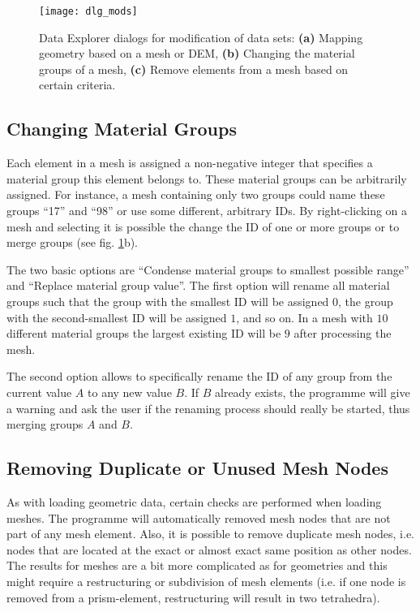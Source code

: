 \begin{figure}[tb]
\begin{center}
\texttt{[image: dlg\_mods]}
\end{center}
\caption{\ogs Data Explorer dialogs for modification of data sets: \textbf{(a)} Mapping geometry based on a mesh or DEM, \textbf{(b)} Changing the material groups of a mesh, \textbf{(c)} Remove elements from a mesh based on certain criteria.} \label{fig:dlgmods}
\end{figure}

\subsection{Changing Material Groups}

Each element in a mesh is assigned a non-negative integer that specifies a material group this element belongs to. These material groups can be arbitrarily assigned. For instance, a mesh containing only two groups could name these groups ``17'' and ``98'' or use some different, arbitrary IDs. By right-clicking on a mesh and selecting  it is possible the change the ID of one or more groups or to merge groups (see fig. \ref{fig:dlgmods}b).

The two basic options are ``Condense material groups to smallest possible range'' and ``Replace material group value''. The first option will rename all material groups such that the group with the smallest ID will be assigned $0$, the group with the second-smallest ID will be assigned $1$, and so on. In a mesh with $10$ different material groups the largest existing ID will be $9$ after processing the mesh.

The second option allows to specifically rename the ID of any group from the current value $A$ to any new value $B$. If $B$ already exists, the programme will give a warning and ask the user if the renaming process should really be started, thus merging groups $A$ and $B$.

\subsection{Removing Duplicate or Unused Mesh Nodes}

As with loading geometric data, certain checks are performed when loading meshes. The programme will automatically removed mesh nodes that are not part of any mesh element. Also, it is possible to remove duplicate mesh nodes, i.e. nodes that are located at the exact or almost exact same position as other nodes. The results for meshes are a bit more complicated as for geometries and this might require a restructuring or subdivision of mesh elements (i.e. if one node is removed from a prism-element, restructuring will result in two tetrahedra).

